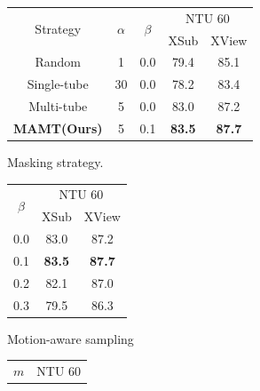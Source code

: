 \begin{figure}[tb] \scriptsize
    \centering
    \begin{subfigure}[t]{0.5\linewidth}
        \centering
        \begin{tabular}{c c c c c}
            \toprule
            \multirow{2}{*}{Strategy} & \multirow{2}{*}{$\alpha$} & \multirow{2}{*}{$\beta$} & \multicolumn{2}{c}{NTU 60} \\
            & & & XSub & XView \\
            \midrule
            Random & 1 & 0.0 & 79.4 & 85.1 \\
            Single-tube & 30 & 0.0 & 78.2 & 83.4 \\
            Multi-tube & 5 & 0.0 & 83.0 & 87.2 \\
            \textbf{MAMT(Ours)} & 5 & 0.1 & \textbf{83.5} & \textbf{87.7} \\
            \bottomrule
        \end{tabular}
        \caption{Masking strategy.}
        \label{tab:masking_strategy}
    \end{subfigure}
    \hfill
    \begin{subfigure}[t]{0.24\linewidth}
        \centering
        \begin{tabular}{c c c}
            \toprule
            \multirow{2}{*}{$\beta$} & \multicolumn{2}{c}{NTU 60} \\
            & XSub & XView \\
            \midrule
            0.0 & 83.0 & 87.2 \\
            0.1 & \textbf{83.5} & \textbf{87.7} \\
            0.2 & 82.1 & 87.0 \\
            0.3 & 79.5 & 86.3 \\
            \bottomrule
        \end{tabular}
        \caption{Motion-aware sampling}
        \label{tab:beta}
    \end{subfigure}
    \hfill
    \begin{subfigure}[t]{0.24\linewidth}
        \centering
        \begin{tabular}{c c c}
            \toprule
            \multirow{2}{*}{$m$} & \multicolumn{2}{c}{NTU 60} \\

\end{tabular}
\end{subfigure}
\end{figure}
